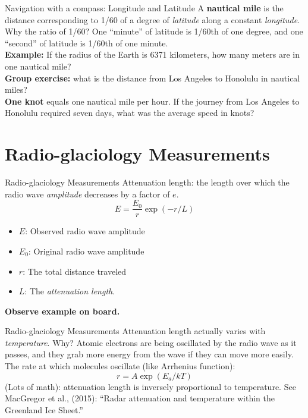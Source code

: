 \documentclass{beamer}
\begin{document}
\begin{frame}{Navigation with a compass: Longitude and Latitude}
\small
A \textbf{nautical mile} is the distance corresponding to 1/60 of a degree of \textit{latitude} along a constant \textit{longitude.}  Why the ratio of 1/60?  One ``minute'' of latitude is 1/60th of one degree, and one ``second'' of latitude is 1/60th of one minute. \\ \vspace{0.75cm}
\textbf{Example:} If the radius of the Earth is 6371 kilometers, how many meters are in one nautical mile? \\ \vspace{0.75cm}
\textbf{Group exercise:} what is the distance from Los Angeles to Honolulu in nautical miles? \\ \vspace{0.75cm}
\textbf{One knot} equals one nautical mile per hour.  If the journey from Los Angeles to Honolulu required seven days, what was the average speed in knots?
\end{frame}

\section{Radio-glaciology Measurements}

\begin{frame}{Radio-glaciology Measurements}
\small
Attenuation length: the length over which the radio wave \textit{amplitude} decreases by a factor of $e$.
\begin{equation}
E = \frac{E_0}{r} \exp(-r/L)
\end{equation}
\begin{itemize}
\item $E$: Observed radio wave amplitude
\item $E_0$: Original radio wave amplitude
\item $r$: The total distance traveled
\item $L$: The \textit{attenuation length}.
\end{itemize}
\textbf{Observe example on board.}
\end{frame}

\begin{frame}{Radio-glaciology Measurements}
Attenuation length actually varies with \textit{temperature}.  Why?  Atomic electrons are being oscillated by the radio wave as it passes, and they grab more energy from the wave if they can move more easily. \\ \vspace{0.5cm}
The rate at which molecules oscillate (like Arrhenius function):
\begin{equation}
r = A \exp(E_a / kT)
\end{equation}
(Lots of math): attenuation length is inversely proportional to temperature.  See MacGregor et al., (2015): ``Radar attenuation and temperature within the Greenland Ice Sheet.''
\end{frame}
\end{document}
